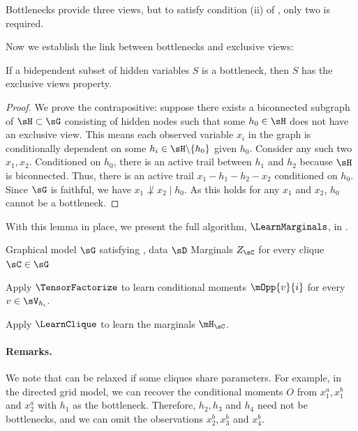 Bottlenecks provide three views, but to satisfy condition (ii) of ,
only two is required.

Now we establish the link between bottlenecks and exclusive views:
\begin{lemma}
  \label{lem:bottleneck-views}  
  If a bidependent subset of hidden variables $S$ is a bottleneck,
  then $S$ has the exclusive views property.
\end{lemma}
\begin{proof}
We prove the contrapositive: suppose there exists a biconnected subgraph of $\sH \subset \sG$ consisting of hidden nodes
such that some $h_0 \in \sH$ does not have an exclusive view.
This means each observed variable $x_i$ in the graph is conditionally dependent on some
$h_i \in \sH \backslash \{h_0\}$ given $h_0$.
Consider any such two $x_1, x_2$.
Conditioned on $h_0$,
there is an active trail between $h_1$ and $h_2$ because $\sH$ is biconnected.
Thus, there is an active trail $x_1 - h_1 - h_2 - x_2$ conditioned on $h_0$.
Since $\sG$ is faithful, we have $x_1 \not\perp x_2 \mid h_0$.
As this holds for any $x_1$ and $x_2$, $h_0$ cannot be a bottleneck.
\end{proof}

With this lemma in place, we present the full algorithm, $\LearnMarginals$,
in .

\begin{algorithm}
  \caption{\LearnMarginals}
  \label{algo:directed}
  \begin{algorithmic}
    \REQUIRE Graphical model $\sG$ satisfying , data $\sD$
    \ENSURE Marginals $Z_\sC$ for every clique $\sC \in \sG$

        \STATE Apply $\TensorFactorize$ to learn conditional moments
        $\mOpp{v}{i}$ for every $v \in \sV_{h_i}$.

      \ENDFOR
\STATE Apply $\LearnClique$ to learn the marginals $\mH_\sC$.
\ENDFOR
  \end{algorithmic}
\end{algorithm}


\paragraph{Remarks.} We note that  can be relaxed if some cliques
  share parameters.
For example, in the directed grid model, we can recover the conditional moments $O$ from
  $x^a_1, x^b_1$ and $x^a_2$ with $h_1$ as the bottleneck.
  Therefore, $h_2, h_3$ and $h_4$
  need not be bottlenecks, and we can omit the observations $x^b_2, x^b_3$ and $x^b_4$.


